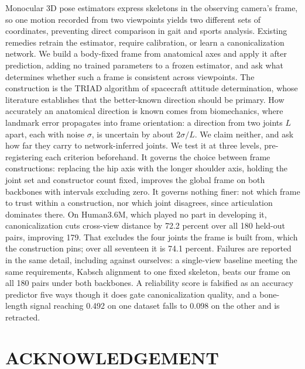 \documentclass[12pt,a4paper]{report}
\begin{document}
\doublespacing
{\fontsize{12}{15}\selectfont
Monocular 3D pose estimators express skeletons in the observing camera's frame, so one motion recorded from two viewpoints yields two different sets of coordinates, preventing direct comparison in gait and sports analysis. Existing remedies retrain the estimator, require calibration, or learn a canonicalization network. We build a body-fixed frame from anatomical axes and apply it after prediction, adding no trained parameters to a frozen estimator, and ask what determines whether such a frame is consistent across viewpoints. The construction is the TRIAD algorithm of spacecraft attitude determination, whose literature establishes that the better-known direction should be primary. How accurately an anatomical direction is known comes from biomechanics, where landmark error propagates into frame orientation: a direction from two joints $L$ apart, each with noise $\sigma$, is uncertain by about $2\sigma/L$. We claim neither, and ask how far they carry to network-inferred joints. We test it at three levels, pre-registering each criterion beforehand. It governs the choice between frame constructions: replacing the hip axis with the longer shoulder axis, holding the joint set and constructor count fixed, improves the global frame on both backbones with intervals excluding zero. It governs nothing finer: not which frame to trust within a construction, nor which joint disagrees, since articulation dominates there. On Human3.6M, which played no part in developing it, canonicalization cuts cross-view distance by 72.2 percent over all 180 held-out pairs, improving 179. That excludes the four joints the frame is built from, which the construction pins; over all seventeen it is 74.1 percent. Failures are reported in the same detail, including against ourselves: a single-view baseline meeting the same requirements, Kabsch alignment to one fixed skeleton, beats our frame on all 180 pairs under both backbones. A reliability score is falsified as an accuracy predictor five ways though it does gate canonicalization quality, and a bone-length signal reaching 0.492 on one dataset falls to 0.098 on the other and is retracted.
}

\newpage
\chapter*{ACKNOWLEDGEMENT}
\end{document}
